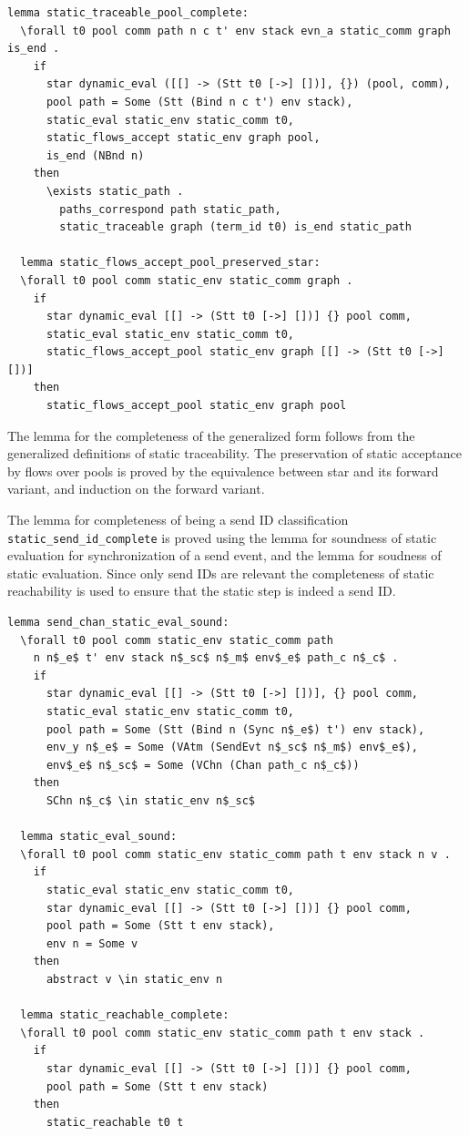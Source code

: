 \documentclass[10pt]{article}
\begin{document}
\begin{lstlisting}[language=logic, mathescape]
  lemma static_traceable_pool_complete:
  \forall t0 pool comm path n c t' env stack evn_a static_comm graph is_end .
    if
      star dynamic_eval ([[] -> (Stt t0 [->] [])], {}) (pool, comm), 
      pool path = Some (Stt (Bind n c t') env stack), 
      static_eval static_env static_comm t0, 
      static_flows_accept static_env graph pool, 
      is_end (NBnd n)
    then
      \exists static_path . 
        paths_correspond path static_path, 
        static_traceable graph (term_id t0) is_end static_path

  lemma static_flows_accept_pool_preserved_star:
  \forall t0 pool comm static_env static_comm graph .
    if
      star dynamic_eval [[] -> (Stt t0 [->] [])] {} pool comm, 
      static_eval static_env static_comm t0,
      static_flows_accept_pool static_env graph [[] -> (Stt t0 [->] [])]
    then
      static_flows_accept_pool static_env graph pool 
\end{lstlisting}


The lemma for the completeness of the generalized form follows from the generalized definitions
of static traceability. The preservation of static acceptance by flows over pools is proved by the
equivalence between star and its forward variant, and induction on the forward variant.

The lemma for completeness of being a send ID classification \lstinline{static_send_id_complete}
is proved using the lemma for
soundness of static evaluation for synchronization of a send event,
and the lemma for soudness of static evaluation.
Since only send IDs are relevant the completeness of static reachability is
used to ensure that the static step is indeed a send ID. 

\begin{lstlisting}[language=logic, mathescape]
  lemma send_chan_static_eval_sound:
  \forall t0 pool comm static_env static_comm path
    n n$_e$ t' env stack n$_sc$ n$_m$ env$_e$ path_c n$_c$ .
    if
      star dynamic_eval [[] -> (Stt t0 [->] [])], {} pool comm,
      static_eval static_env static_comm t0,
      pool path = Some (Stt (Bind n (Sync n$_e$) t') env stack),
      env_y n$_e$ = Some (VAtm (SendEvt n$_sc$ n$_m$) env$_e$),
      env$_e$ n$_sc$ = Some (VChn (Chan path_c n$_c$))
    then
      SChn n$_c$ \in static_env n$_sc$

  lemma static_eval_sound:
  \forall t0 pool comm static_env static_comm path t env stack n v .
    if
      static_eval static_env static_comm t0, 
      star dynamic_eval [[] -> (Stt t0 [->] [])] {} pool comm,
      pool path = Some (Stt t env stack), 
      env n = Some v
    then
      abstract v \in static_env n 

  lemma static_reachable_complete:
  \forall t0 pool comm static_env static_comm path t env stack .
    if
      star dynamic_eval [[] -> (Stt t0 [->] [])] {} pool comm,
      pool path = Some (Stt t env stack)
    then
      static_reachable t0 t 
\end{lstlisting}
\end{document}
